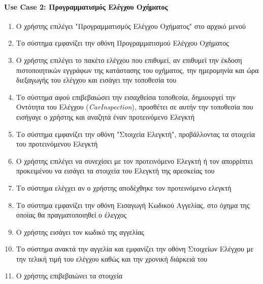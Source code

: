 \documentclass{../ol-softwaremanual}
\begin{document}
	
	
	
	
	\newpage
	
	
	\paragraph{\en Use Case 2: \gr Προγραμματισμός Ελέγχου Οχήματος}
	
	\begin{enumerate}
		\item Ο χρήστης επιλέγει \en"\gr Προγραμματισμός Ελέγχου Οχήματος\en" \gr στο αρχικό μενού
		\item Το σύστημα εμφανίζει την οθόνη Προγραμματισμού Ελέγχου Οχήματος
		\item Ο χρήστης επιλέγει το πακέτο ελέγχου που επιθυμεί, αν επιθυμεί την έκδοση πιστοποιητικών εγγράφων της κατάστασης του οχήματος, την ημερομηνία και ώρα διεξαγωγής του ελέγχου και εισάγει την τοποθεσία του
		\item Το σύστημα αφού επιβεβαιώσει την εισαχθείσα τοποθεσία, δημιουργεί την Οντότητα του Ελέγχου (\en \textit{CarInspection}\gr), προσθέτει σε αυτήν την τοποθεσία που εισήγαγε ο χρήστης και αναζητά έναν προτεινόμενο Ελεγκτή
		\item Το σύστημα εμφανίζει την οθόνη \en"\gr Στοιχεία Ελεγκτή\en"\gr, προβάλλοντας τα στοιχεία του προτεινόμενου Ελεγκτή
		\item Ο χρήστης επιλέγει να συνεχίσει με τον προτεινόμενο Ελεγκτή ή τον απορρίπτει προκειμένου να εισάγει τα στοιχεία του Ελεγκτή της αρεσκείας του
		\item Το σύστημα ελέγχει αν ο χρήστης αποδέχθηκε τον προτεινόμενο ελεγκτή
		\item Το σύστημα εμφανίζει την οθόνη Εισαγωγή Κωδικού Αγγελίας, στο όχημα της οποίας θα πραγματοποιηθεί ο έλεγχος		
		\item Ο χρήστης εισάγει τον κωδικό της αγγελίας
		\item Το σύστημα ανακτά την αγγελία και εμφανίζει την οθόνη Στοιχείων Ελέγχου με την τελική τιμή του ελέγχου καθώς και την χρονική διάρκειά του
		\item Ο χρήστης επιβεβαιώνει τα στοιχεία

\end{enumerate}
\end{document}
